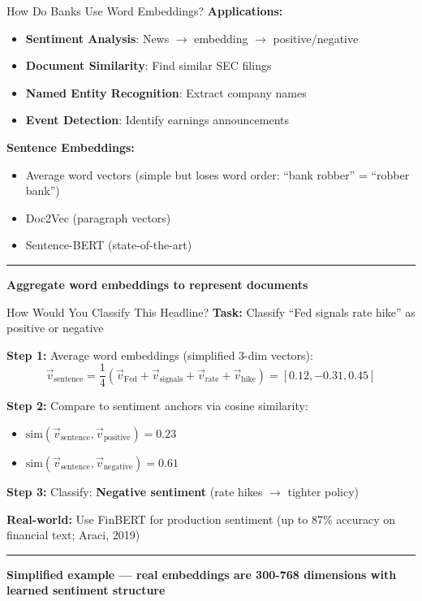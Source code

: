 \documentclass[8pt,aspectratio=169]{beamer}
\newcommand{\bottomnote}[1]{%
\vfill
\vspace{-2mm}
\textcolor{mllavender2}{\rule{\textwidth}{0.4pt}}
\vspace{1mm}
\footnotesize
\textbf{#1}
}
\newcommand{\highlight}[1]{\textcolor{mlorange}{\textbf{#1}}}
\begin{document}
\begin{frame}[t]{How Do Banks Use Word Embeddings?}
\textbf{Applications:}
\begin{itemize}
\item \textbf{Sentiment Analysis}: News $\rightarrow$ embedding $\rightarrow$ positive/negative
\item \textbf{Document Similarity}: Find similar SEC filings
\item \textbf{Named Entity Recognition}: Extract company names
\item \textbf{Event Detection}: Identify earnings announcements
\end{itemize}
\vspace{0.5em}
\textbf{Sentence Embeddings:}
\begin{itemize}
\item Average word vectors (simple but loses word order: ``bank robber'' = ``robber bank'')
\item Doc2Vec (paragraph vectors)
\item Sentence-BERT (state-of-the-art)
\end{itemize}
\bottomnote{Aggregate word embeddings to represent documents}
\end{frame}

\begin{frame}[t]{How Would You Classify This Headline?}
\textbf{Task:} Classify ``Fed signals rate hike'' as positive or negative
\vspace{0.3em}

\textbf{Step 1:} Average word embeddings (simplified 3-dim vectors):
\[
\vec{v}_{\text{sentence}} = \frac{1}{4}(\vec{v}_{\text{Fed}} + \vec{v}_{\text{signals}} + \vec{v}_{\text{rate}} + \vec{v}_{\text{hike}}) = [0.12, -0.31, 0.45]
\]

\textbf{Step 2:} Compare to sentiment anchors via cosine similarity:
\begin{itemize}
\item $\text{sim}(\vec{v}_{\text{sentence}}, \vec{v}_{\text{positive}}) = 0.23$
\item $\text{sim}(\vec{v}_{\text{sentence}}, \vec{v}_{\text{negative}}) = 0.61$
\end{itemize}

\textbf{Step 3:} Classify: \highlight{Negative sentiment} (rate hikes $\rightarrow$ tighter policy)
\vspace{0.3em}

\textbf{Real-world:} Use FinBERT for production sentiment (up to 87\% accuracy on financial text; Araci, 2019)
\bottomnote{Simplified example --- real embeddings are 300-768 dimensions with learned sentiment structure}
\end{frame}
\end{document}
